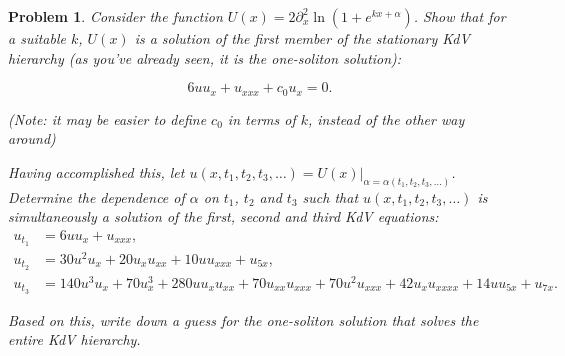 \documentclass[12pt]{report}
\newtheorem{problem}{Problem}
\begin{document}
\newpage



\begin{problem}
    Consider the function $U(x)=2\partial_x^2\ln\left(1+e^{kx+\alpha}\right)$.
Show that for a suitable $k$, $U(x)$ is a solution of the first member of the
stationary KdV hierarchy (as you've already seen, it is the one-soliton
solution):

$$
6uu_x+u_{xxx}+c_0 u_x=0.
$$

\noindent (Note: it may be easier to define $c_0$ in terms of $k$, instead of
the other way around)

\noindent Having accomplished this, let
$u(x,t_1,t_2,t_3,\ldots)=U(x)|_{\alpha=\alpha(t_1,t_2,t_3,\ldots)}$. Determine
the dependence of $\alpha$ on $t_1$, $t_2$ and $t_3$ such that
$u(x,t_1,t_2,t_3,\ldots)$ is simultaneously a solution of the first, second and
third KdV equations:
\begin{align*}
    u_{t_1}&=6 u u_x+u_{xxx},\\
    u_{t_2}&=30u^2u_x+20u_x u_{xx}+10u u_{xxx}+u_{5x},\\
    u_{t_3}&=140 u^3 u_x+70 u_x^3+280 u u_x u_{xx}+70 u_{xx}u_{xxx}+70
    u^2 u_{xxx}+42u_x u_{xxxx}+14 u u_{5x}+u_{7x}.
\end{align*}

\noindent Based on this, write down a guess for the one-soliton solution that solves the entire KdV hierarchy.
\end{problem}
\end{document}

